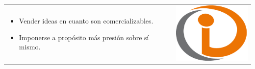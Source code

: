 \begin{frame}
\frametitle{}
\begin{table}
\begin{tabular}{p{7cm}p{3cm}}
\begin{itemize}
    \item Vender ideas en cuanto son comercializables.
    \item Imponerse a propósito más presión sobre sí mismo.
\end{itemize}
&
\vspace{1.5cm}
\includegraphics[width=4cm]{img/example}\\
\end{tabular}
\end{table}
\end{frame}

